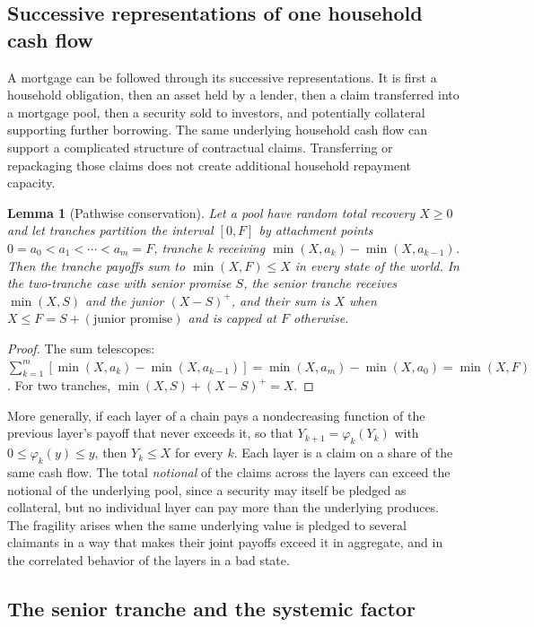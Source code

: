 \documentclass[11pt]{article}
\newtheorem{lemma}[theorem]{Lemma}
\theoremstyle{definition}
\theoremstyle{remark}
\begin{document}
\subsection{Successive representations of one household cash flow}

A mortgage can be followed through its successive representations. It is first a household obligation, then an asset held by a lender, then a claim transferred into a mortgage pool, then a security sold to investors, and potentially collateral supporting further borrowing. The same underlying household cash flow can support a complicated structure of contractual claims. Transferring or repackaging those claims does not create additional household repayment capacity.

\begin{lemma}[Pathwise conservation]\label{lem:tranche}
Let a pool have random total recovery $X\ge 0$ and let tranches partition the interval $[0,F]$ by attachment points $0=a_0<a_1<\cdots<a_m=F$, tranche $k$ receiving $\min(X,a_k)-\min(X,a_{k-1})$. Then the tranche payoffs sum to $\min(X,F)\le X$ in every state of the world. In the two-tranche case with senior promise $S$, the senior tranche receives $\min(X,S)$ and the junior $(X-S)^+$, and their sum is $X$ when $X\le F=S+(\text{junior promise})$ and is capped at $F$ otherwise.
\end{lemma}

\begin{proof}
The sum telescopes: $\sum_{k=1}^m[\min(X,a_k)-\min(X,a_{k-1})]=\min(X,a_m)-\min(X,a_0)=\min(X,F)$. For two tranches, $\min(X,S)+(X-S)^+=X$.
\end{proof}

More generally, if each layer of a chain pays a nondecreasing function of the previous layer's payoff that never exceeds it, so that $Y_{k+1}=\varphi_k(Y_k)$ with $0\le\varphi_k(y)\le y$, then $Y_k\le X$ for every $k$. Each layer is a claim on a share of the same cash flow. The total \emph{notional} of the claims across the layers can exceed the notional of the underlying pool, since a security may itself be pledged as collateral, but no individual layer can pay more than the underlying produces. The fragility arises when the same underlying value is pledged to several claimants in a way that makes their joint payoffs exceed it in aggregate, and in the correlated behavior of the layers in a bad state.

\subsection{The senior tranche and the systemic factor}
\end{document}
